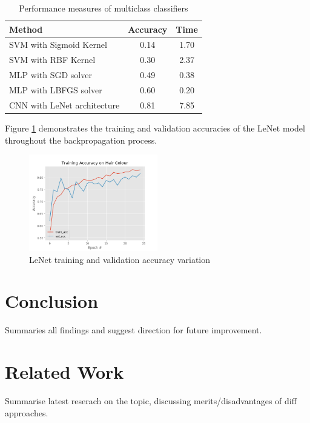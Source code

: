 \documentclass[conference]{IEEEtran}
\begin{document}
\begin{table}[htp]
\caption{Performance measures of multiclass classifiers}
\begin{center}
\renewcommand{\arraystretch}{1.5}
\begin{tabular}{|l|c|c|}
\hline
\hspace{1cm} Method & Accuracy & Time\\ \hline
SVM with Sigmoid Kernel & 0.14 & 1.70\\ \hline
SVM with RBF Kernel & 0.30 & 2.37\\ \hline
MLP with SGD solver & 0.49 & 0.38\\ \hline
MLP with LBFGS solver & 0.60 & 0.20\\ \hline
CNN with LeNet architecture & 0.81 & 7.85\\ \hline
\end{tabular}
\end{center}
\label{tab: mult}
\end{table}%


Figure \ref{fig: CNN} demonstrates the training and validation accuracies of the LeNet model throughout the backpropagation process. 

\begin{figure} [h] %
  \centering
    \includegraphics[width=0.5\textwidth]{graphs/T5_CNN_Keras} 
    \caption{LeNet training and validation accuracy variation}
    \label{fig: CNN}
\end{figure}

\section{Conclusion} \label{s-concl}

Summaries all findings and suggest direction for future improvement.\\

\section{Related Work} \label{s-rel-work}

Summarise latest reserach on the topic, discussing merits/disadvantages of diff approaches.\\




\end{document}
